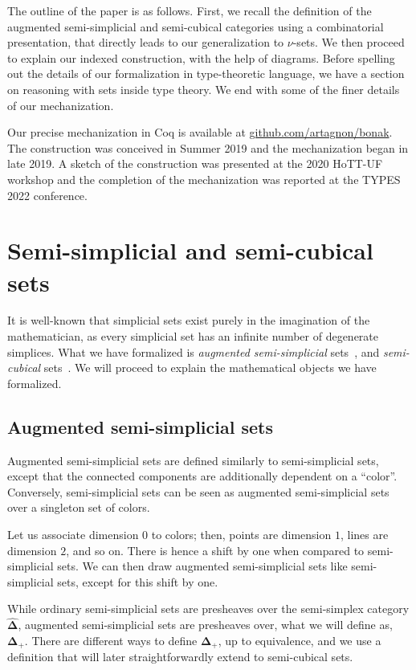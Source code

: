 \documentclass[10pt]{art.cls/art}
\newcommand{\DeltaHat}{\ensuremath{\hat{\boldsymbol{\Delta}}}}
\newcommand{\DeltaPlus}{\ensuremath{\boldsymbol{\Delta}_+}}
\begin{document}
The outline of the paper is as follows. First, we recall the definition of the augmented semi-simplicial and semi-cubical categories using a combinatorial presentation, that directly leads to our generalization to $\nu$-sets. We then proceed to explain our indexed construction, with the help of diagrams. Before spelling out the details of our formalization in type-theoretic language, we have a section on reasoning with sets inside type theory. We end with some of the finer details of our mechanization. %

Our precise mechanization in Coq is available at \href{https://github.com/artagnon/bonak}{github.com/artagnon/bonak}. The construction was conceived in Summer 2019 and the mechanization began in late 2019. A sketch of the construction was presented at the 2020 HoTT-UF workshop and the completion of the mechanization was reported at the TYPES 2022 conference.

\section{Semi-simplicial and semi-cubical sets}
It is well-known that simplicial sets exist purely in the imagination of the mathematician, as every simplicial set has an infinite number of degenerate simplices. What we have formalized is \emph{augmented semi-simplicial} sets~\cite{fri08}, and \emph{semi-cubical} sets~\cite{grandis03,buchholtz17}. We will proceed to explain the mathematical objects we have formalized. %

\subsection{Augmented semi-simplicial sets}
Augmented semi-simplicial sets are defined similarly to semi-simplicial sets, except that the connected components are additionally dependent on a ``color''. Conversely, semi-simplicial sets can be seen as augmented semi-simplicial sets over a singleton set of colors.

Let us associate dimension $0$ to colors; then, points are dimension $1$, lines are dimension $2$, and so on. There is hence a shift by one when compared to semi-simplicial sets. We can then draw augmented semi-simplicial sets like semi-simplicial sets, except for this shift by one.

While ordinary semi-simplicial sets are presheaves over the semi-simplex category \DeltaHat, augmented semi-simplicial sets are presheaves over, what we will define as, \DeltaPlus. There are different ways to define \DeltaPlus, up to equivalence, and we use a definition that will later straightforwardly extend to semi-cubical sets.
\end{document}
